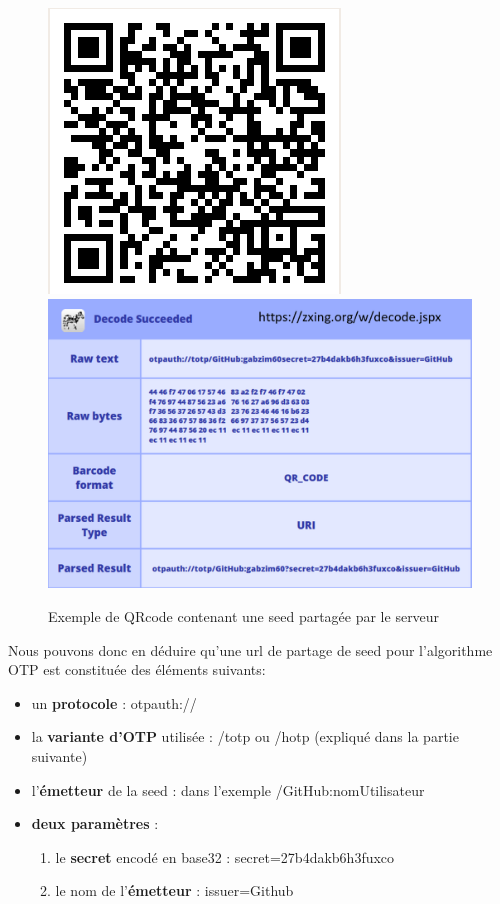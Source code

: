 \documentclass[a4paper, 10pt]{article}
\newcommand{\otp}{\textsc{OTP} }
\begin{document}
\begin{figure}[H]
        \centering
        \includegraphics[scale=0.5]{img/1/1/qrcode.png}
        \includegraphics[scale=1]{img/1/1/qrcode-content.png}
        \caption{Exemple de QRcode contenant une seed partagée par le serveur\\}
        \label{fig:2fa-qrcode}
\end{figure}


\noindent
Nous pouvons donc en déduire qu'une \textcolor{myblue}{url de partage de seed} pour l'algorithme \otp est constituée des éléments suivants:
\begin{itemize}
    \item un \textbf{protocole} : \textcolor{mygreen}{otpauth://}
    \item la \textbf{variante d'\otp} utilisée : /totp ou /hotp (expliqué dans la partie suivante)
    \item l'\textbf{émetteur} de la seed : dans l'exemple /GitHub:nomUtilisateur
    \item \textbf{deux paramètres} :
        \begin{enumerate}
            \item le \textbf{secret} encodé en base32 : secret=27b4dakb6h3fuxco
            \item le nom de l'\textbf{émetteur} : issuer=Github
        \end{enumerate}
\end{itemize}    
\end{document}
